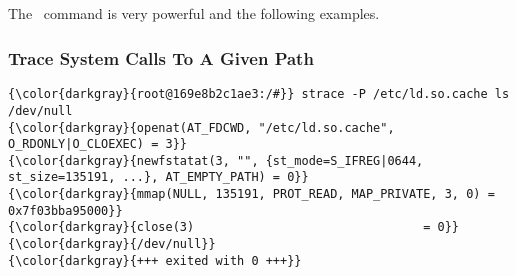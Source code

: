 % 

\subsection{\strace}
\label{sec:strace}
The \strace \ command is very powerful and the following examples.

		\subsubsection{Trace System Calls To A Given Path}
{\footnotesize{
\begin{Verbatim}[commandchars=\\\{\}]
{\color{darkgray}{root@169e8b2c1ae3:/#}} strace -P /etc/ld.so.cache ls /dev/null 
{\color{darkgray}{openat(AT_FDCWD, "/etc/ld.so.cache", O_RDONLY|O_CLOEXEC) = 3}}
{\color{darkgray}{newfstatat(3, "", {st_mode=S_IFREG|0644, st_size=135191, ...}, AT_EMPTY_PATH) = 0}}
{\color{darkgray}{mmap(NULL, 135191, PROT_READ, MAP_PRIVATE, 3, 0) = 0x7f03bba95000}}
{\color{darkgray}{close(3)                                = 0}}
{\color{darkgray}{/dev/null}}
{\color{darkgray}{+++ exited with 0 +++}}
\end{Verbatim}
}}


